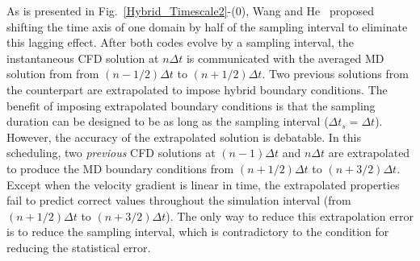 \documentclass[preprint,12pt]{elsarticle}
\begin{document}

As is presented in Fig.~\ref{Hybrid_Timescale2}-(0), Wang and He~\cite{Wang} proposed shifting the time axis of one domain by half of the sampling interval to eliminate this lagging effect. After both codes evolve by a sampling interval, the instantaneous CFD solution at $n{\Delta}t$ is communicated with the averaged MD solution from from $(n-1/2){\Delta}t$ to $(n+1/2){\Delta}t$. Two previous solutions from the counterpart are extrapolated to impose hybrid boundary conditions. The benefit of imposing extrapolated boundary conditions is that the sampling duration can be designed to be as long as the sampling interval (${\Delta}t_{s}={\Delta}t$). However, the accuracy of the extrapolated solution is debatable. In this scheduling, two  \textit{previous} CFD solutions at $(n-1){\Delta}t$ and $n{\Delta}t$ are extrapolated to produce the MD boundary conditions from $(n+1/2){\Delta}t$ to $(n+3/2){\Delta}t$. Except when the velocity gradient is linear in time, the extrapolated properties fail to predict correct values throughout the simulation interval (from$(n+1/2){\Delta}t$ to $(n+3/2){\Delta}t$). The only way to reduce this extrapolation error is to reduce the sampling interval, which is contradictory to the condition for reducing the statistical error.
\end{document}
